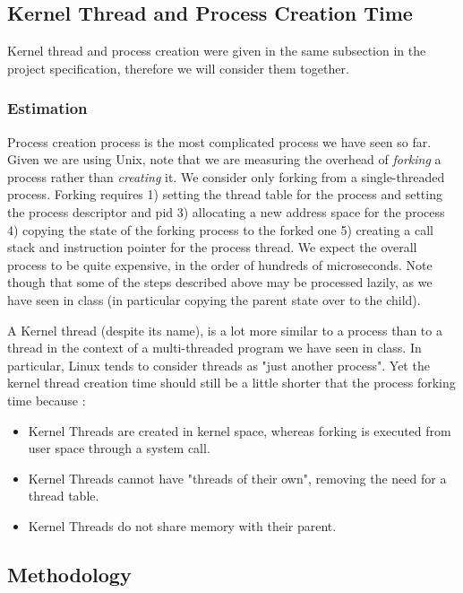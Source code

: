 \subsection{Kernel Thread and Process Creation Time}

Kernel thread and process creation were given in the same subsection in the project
specification, therefore we will consider them together.

\subsubsection{Estimation}

Process creation process is the most complicated process we have seen so far. Given we are
using Unix, note that we are measuring the overhead of \emph{forking} a process rather than
\emph{creating} it. We consider only forking from a single-threaded process. Forking requires 1) setting the thread table for the
process and setting the process descriptor and pid 3) allocating a new address space for the process
4) copying the state of the forking process to the forked one 5) creating a call stack and instruction pointer 
for the process thread. We expect the overall process to be quite expensive, in the order of hundreds of 
microseconds. Note though that some of the steps described above may be processed lazily, as we have 
seen in class (in particular copying the parent state over to the child). 

A Kernel thread (despite its name), is a lot more similar to a process than to a thread in the context of 
a multi-threaded program we have seen in class. In particular, Linux tends to consider threads as "just another process".
Yet the kernel thread creation time should still be a little shorter that the process forking time because :

\begin{itemize}
\item{Kernel Threads are created in kernel space, whereas forking is executed from user space through a system call.}
\item{Kernel Threads cannot have "threads of their own", removing the need for a thread table.}
\item{Kernel Threads do not share memory with their parent.}
\end{itemize} 

\subsection{Methodology}

